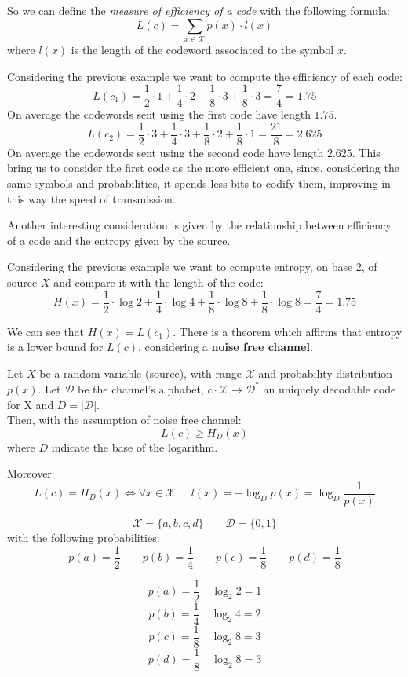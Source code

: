 So we can define the \textit{measure of efficiency of a code} with the following formula:
		$$L(c)=\sum_{x \in \mathcal{X}} p(x)\cdot l(x)$$
where $l(x)$ is the length of the codeword associated to the symbol $x$.

\begin{exmp} Considering the previous example we want to compute the efficiency of each code:
	$$
		L(c_1) = \frac{1}{2} \cdot 1 + \frac{1}{4} \cdot 2 + \frac{1}{8} \cdot 3 + \frac{1}{8} \cdot 3 = \frac{7}{4} = 1.75
	$$
	On average the codewords sent using the first code have length $1.75$.
	$$	
		L(c_2) = \frac{1}{2} \cdot 3 + \frac{1}{4} \cdot 3 + \frac{1}{8} \cdot 2 + \frac{1}{8} \cdot 1 = \frac{21}{8} = 2.625
	$$
	On average the codewords sent using the second code have length $2.625$. This bring us to consider the first code as the more efficient one, since, considering the same symbols and probabilities, it spends less bits to codify them, improving in this way the speed of transmission.
\end{exmp}

Another interesting consideration is given by the relationship between efficiency of a code and the entropy given by the source.

\begin{exmp} Considering the previous example we want to compute entropy, on base 2, of source $X$ and compare it with the length of the code:
	$$
		H(x) = \frac{1}{2} \cdot \log2 + \frac{1}{4} \cdot \log4 + \frac{1}{8} \cdot \log8 + \frac{1}{8} \cdot \log8 = \frac{7}{4} = 1.75
	$$
\end{exmp}

We can see that $H(x) = L(c_1)$. There is a theorem which affirms that entropy is a lower bound for $L(c)$, considering a \textbf{noise free channel}.
\begin{thm} 
	Let $X$ be a random variable (source), with range $\mathcal{X}$ and probability distribution $p(x)$. 
	Let $\mathcal{D}$ be the channel's alphabet, $c \cdot \mathcal{X} \rightarrow \mathcal{D}^*$ an uniquely decodable code for X and $D = |\mathcal{D}|$.\\
	Then, with the assumption of noise free channel: 
	$$ L(c) \geq H_D(x)$$
	where $D$ indicate the base of the logarithm. 
	
	Moreover:
	$$ L(c) = H_D(x) \iff \forall x \in \mathcal{X}: \quad l(x) = -\log_D p(x) = \log_D \frac{1}{p(x)} $$
\end{thm}

\begin{exmp}
$$\mathcal{X} = \{a, b, c, d\} \qquad \mathcal{D} = \{0,1\}$$
with the following probabilities:
$$p(a) = \frac{1}{2} \qquad p(b) = \frac{1}{4} \qquad p(c) = \frac{1}{8} \qquad p(d) = \frac{1}{8}$$

$$ p(a) = \frac{1}{2} \quad \log_2 2 = 1$$
$$ p(b) = \frac{1}{4} \quad \log_2 4 = 2$$
$$ p(c) = \frac{1}{8} \quad \log_2 8 = 3$$
$$ p(d) = \frac{1}{8} \quad \log_2 8 = 3$$
\end{exmp}

